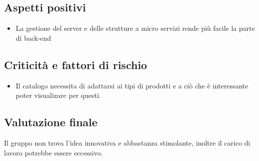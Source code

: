 \subsection{Aspetti positivi}
\begin{itemize}
\item La gestione del server e delle strutture a micro servizi rende più facile la parte di back-end
\end{itemize}

\subsection{Criticità e fattori di rischio}
\begin{itemize}
\item Il catalogo necessita di adattarsi ai tipi di prodotti e a ciò che è interessante poter visualizare per questi.
\end{itemize}

\subsection{Valutazione finale}
Il gruppo non trova l'idea innovativa e abbastanza stimolante, inoltre il carico di lavoro potrebbe essere eccessivo.
